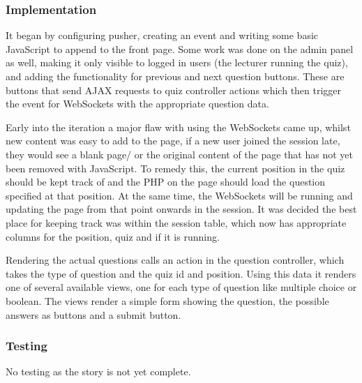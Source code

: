 \begin{center}
\begin{figure}
		\label{fig:quiz-mobile}
	\end{figure}
\end{center}


\subsubsection{Implementation}
It began by configuring pusher, creating an event and writing some basic JavaScript to append to the front page. Some work was done on the admin panel as well, making it only visible to logged in users (the lecturer running the quiz), and adding the functionality for previous and next question buttons. These are buttons that send AJAX requests to quiz controller actions which then trigger the event for WebSockets with the appropriate question data.

Early into the iteration a major flaw with using the WebSockets came up, whilst new content was easy to add to the page, if a new user joined the session late, they would see a blank page/ or the original content of the page that has not yet been removed with JavaScript. To remedy this, the current position in the quiz should be kept track of and the PHP on the page should load the question specified at that position. At the same time, the WebSockets will be running and updating the page from that point onwards in the session. It was decided the best place for keeping track was within the session table, which now has appropriate columns for the position, quiz and if it is running.

Rendering the actual questions calls an action in the question controller, which takes the type of question and the quiz id and position. Using this data it renders one of several available views, one for each type of question like multiple choice or boolean. The views render a simple form showing the question, the possible answers as buttons and a submit button.
\subsubsection{Testing}
No testing as the story is not yet complete.
\newpage
